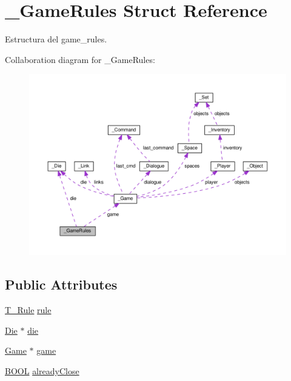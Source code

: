 \hypertarget{struct__GameRules}{\section{\+\_\+\+Game\+Rules Struct Reference}
\label{struct__GameRules}
}


Estructura del game\+\_\+rules.  




Collaboration diagram for \+\_\+\+Game\+Rules\+:
\nopagebreak
\begin{figure}[H]
\begin{center}
\leavevmode
\includegraphics[width=350pt]{struct__GameRules__coll__graph}
\end{center}
\end{figure}
\subsection*{Public Attributes}
\begin{DoxyCompactItemize}
\item 
\hyperlink{game__rules_8h_a60dd8c87b598cf179dc700a896badc6c}{T\+\_\+\+Rule} \hyperlink{struct__GameRules_a6f510ad31232ca35a09da4a6e12ed78b}{rule}
\item 
\hyperlink{die_8h_a892f0b0bf81d69a1f7a14ea238e36dd3}{Die} $\ast$ \hyperlink{struct__GameRules_af45785d6ef48c6b615f0f40f0b70f0bf}{die}
\item 
\hyperlink{game_8h_a57156d39c530aec3fba3a9dad8c2dc6a}{Game} $\ast$ \hyperlink{struct__GameRules_ad68f49101c1660649f387684f91af11a}{game}
\item 
\hyperlink{types_8h_a3e5b8192e7d9ffaf3542f1210aec18dd}{B\+O\+O\+L} \hyperlink{struct__GameRules_a59eb128d579db73908e0a8367ad6fc24}{already\+Close}
\end{DoxyCompactItemize}


